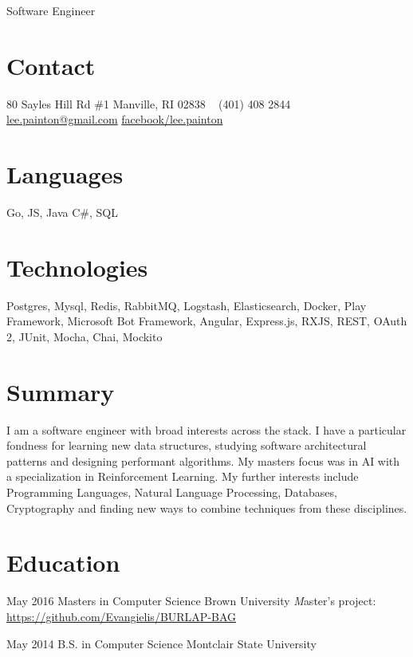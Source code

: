 \documentclass[]{friggeri-cv}
\begin{document}
       {Software Engineer}


\begin{aside} %
\section{\color{brown}Con\color{black}tact}
80 Sayles Hill Rd \#1
Manville, RI 02838
~
(401) 408 2844
~
\href{mailto:lee.painton@gmail.com}{lee.painton@gmail.com}
\href{https://www.facebook.com/lee.painton}{facebook/lee.painton}
\section{\color{violet}Lang\color{black}uages}
{\large Go, JS, Java}
{C\#, SQL}
\section{\color{olive}Tech\color{black}nologies}
{Postgres, Mysql, Redis, RabbitMQ, Logstash, Elasticsearch, Docker, Play Framework, Microsoft Bot Framework, Angular, Express.js, RXJS, REST, OAuth 2, JUnit, Mocha, Chai, Mockito} 
\end{aside}

\section{Summary}

I am a software engineer with broad interests across the stack.  I have a particular fondness for learning new data structures, studying software architectural patterns and designing performant algorithms.  My masters focus was in AI with a specialization in Reinforcement Learning.  My further interests include Programming Languages, Natural Language Processing, Databases, Cryptography and finding new ways to combine techniques from these disciplines.

\section{Education}

\begin{entrylist}

\entry
{May 2016}
{Masters {\normalfont in Computer Science}}
{Brown University}
{\emph Master's project: \href{https://github.com/Evangielis/BURLAP-BAG}{https://github.com/Evangielis/BURLAP-BAG}}

\entry
{May 2014}
{B.S. {\normalfont in Computer Science}}
{Montclair State University}

\end{entrylist}
\end{document}
